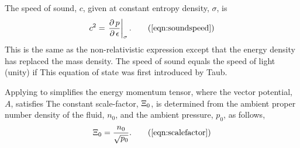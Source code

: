 The speed of sound, $c$,  given at constant entropy density, $\sigma$, is\cite{LandauBook,Taub1978} 
\begin{align}
  c^2 = \given{\frac{\d p}{\d \epsillon}}{\sigma}. 
\tag{\ref{eqn:soundspeed}}
\end{align}
This is the same as the non-relativistic expression except that the energy density has replaced the mass density.
The speed of sound equals the speed of light (unity) if 
This equation of state was first introduced by Taub\cite{Taub1978}.




Applying  to  simplifies the energy momentum tensor,
where the vector potential, $A$,  satisfies
The constant scale-factor, $\Xi_0$, is determined from the ambient proper number density of the fluid, $n_0$, and the ambient pressure, $p_0$, as follows,
\begin{align}
\scalefactor = \frac{n_0}{\sqrt{p_0}}. 
\tag{\ref{eqn:scalefactor}}
\end{align}

